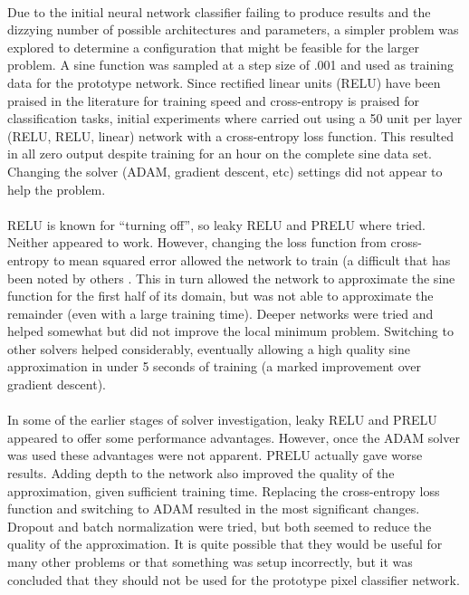 \documentclass[12pt]{article}
\begin{document}
\\
	Due to the initial neural network classifier failing to produce results and the dizzying number of possible architectures and parameters, a simpler problem was explored to determine a configuration that might be feasible for the larger problem.  A sine function was sampled at a step size of .001 and used as training data for the prototype network.  Since rectified linear units (RELU) have been praised in the literature for training speed and cross-entropy is praised for classification tasks, initial experiments where carried out using a 50 unit per layer (RELU, RELU, linear) network with a cross-entropy loss function.  This resulted in all zero output despite training for an hour on the complete sine data set.  Changing the solver (ADAM, gradient descent, etc) settings did not appear to help the problem.\\
\\
	RELU is known for “turning off”, so leaky RELU and PRELU where tried.  Neither appeared to work.  However, changing the loss function from cross-entropy to mean squared error allowed the network to train (a difficult that has been noted by others \cite{crossEntropyWithRELU}.  This in turn allowed the network to approximate the sine function for the first half of its domain, but was not able to approximate the remainder (even with a large training time).  Deeper networks were tried and helped somewhat but did not improve the local minimum problem.  Switching to other solvers helped considerably, eventually allowing a high quality sine approximation in under 5 seconds of training (a marked improvement over gradient descent).\\
\\
	In some of the earlier stages of solver investigation, leaky RELU and PRELU appeared to offer some performance advantages. However, once the ADAM solver was used these advantages were not apparent. PRELU actually gave worse results.  Adding depth to the network also improved the quality of the approximation, given sufficient training time.  Replacing the cross-entropy loss function and switching to ADAM resulted in the most significant changes.  Dropout and batch normalization were tried, but both seemed to reduce the quality of the approximation.  It is quite possible that they would be useful for many other problems or that something was setup incorrectly, but it was concluded that they should not be used for the prototype pixel classifier network.\\
\end{document}

